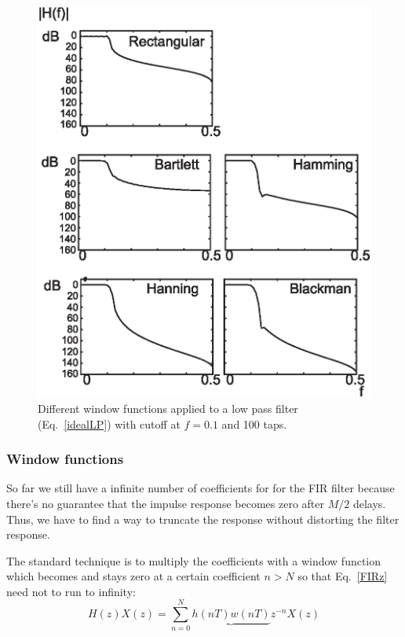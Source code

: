 \documentclass[12pt,a4paper]{article}
\begin{document}
\begin{figure}[!hbt]
\begin{center}
\mbox{\includegraphics[width=\linewidth]{window_functions}}
\caption{Different window functions applied to a low pass filter 
(Eq.~\ref{idealLP}) 
with cutoff at $f=0.1$ and 100 taps. \label{window_functions}}
\end{center}
\end{figure}

\afterpage{\clearpage}


\subsubsection{Window functions}
So far we still have a infinite number of coefficients for 
for the FIR filter because there's no guarantee that the 
impulse response becomes zero
after $M/2$ delays. Thus, we have to find a way to truncate the
response without distorting the filter response.

The standard technique is to multiply the coefficients with a window
function which becomes and stays zero at a certain coefficient
$n>N$ so that Eq.~\ref{FIRz} need not to run to infinity:
\begin{equation}
\label{FIRzlimit}
H(z)X(z)=\sum_{n=0}^N \underbrace{h(nT) w(nT)} z^{-n} X(z)
\end{equation}
\end{document}
